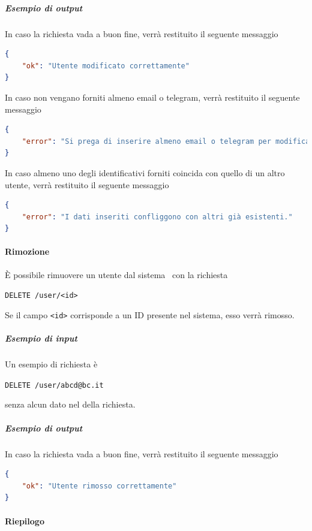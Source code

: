     \subparagraph{Esempio di output}
    In caso la richiesta vada a buon fine, verrà restituito il seguente messaggio
	\begin{lstlisting}[language = json]
{
    "ok": "Utente modificato correttamente"
}
	\end{lstlisting}

	In caso non vengano forniti almeno email o telegram, verrà restituito il seguente messaggio
	\begin{lstlisting}[language = json]
{
    "error": "Si prega di inserire almeno email o telegram per modificare l'utente."
}
	\end{lstlisting}

	In caso almeno uno degli identificativi forniti coincida con quello di un altro utente, verrà restituito il seguente messaggio
	\begin{lstlisting}[language = json]
{
    "error": "I dati inseriti confliggono con altri già esistenti."
}
	\end{lstlisting}

\paragraph{Rimozione}

È possibile rimuovere un utente dal sistema \progetto\ con la richiesta
\begin{center}
    \texttt{DELETE /user/<id>}
\end{center}

Se il campo \texttt{<id>} corrisponde a un ID presente nel sistema, esso verrà rimosso.

    \subparagraph{Esempio di input}
    Un esempio di richiesta è
    \begin{center}
        \texttt{DELETE  /user/abcd@bc.it}
    \end{center}
    senza alcun dato nel  della richiesta.

    \subparagraph{Esempio di output}
    In caso la richiesta vada a buon fine, verrà restituito il seguente messaggio
	\begin{lstlisting}[language = json]
{
    "ok": "Utente rimosso correttamente"
}
	\end{lstlisting}


\paragraph{Riepilogo}

